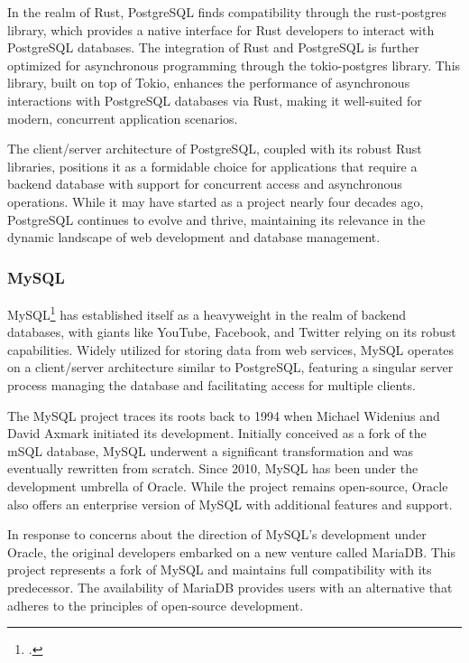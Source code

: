 In the realm of Rust, PostgreSQL finds compatibility through the rust-postgres library, which provides a native interface for Rust developers to interact with 
PostgreSQL databases. The integration of Rust and PostgreSQL is further optimized for asynchronous programming through the tokio-postgres library. This library, 
built on top of Tokio, enhances the performance of asynchronous interactions with PostgreSQL databases via Rust, making it well-suited for modern, concurrent 
application scenarios.\newline

The client/server architecture of PostgreSQL, coupled with its robust Rust libraries, positions it as a formidable choice for applications that require a 
backend database with support for concurrent access and asynchronous operations. While it may have started as a project nearly four decades ago, PostgreSQL 
continues to evolve and thrive, maintaining its relevance in the dynamic landscape of web development and database management.

\subsubsection{MySQL}
MySQL\footcite{mysql} has established itself as a heavyweight in the realm of backend databases, with giants like YouTube, Facebook, and Twitter relying on its 
robust capabilities. Widely utilized for storing data from web services, MySQL operates on a client/server architecture similar to PostgreSQL, featuring a 
singular server process managing the database and facilitating access for multiple clients.\newline

The MySQL project traces its roots back to 1994 when Michael Widenius and David Axmark initiated its development. Initially conceived as a fork of the mSQL 
database, MySQL underwent a significant transformation and was eventually rewritten from scratch. Since 2010, MySQL has been under the development umbrella of 
Oracle. While the project remains open-source, Oracle also offers an enterprise version of MySQL with additional features and support.\newline

In response to concerns about the direction of MySQL's development under Oracle, the original developers embarked on a new venture called MariaDB. This project 
represents a fork of MySQL and maintains full compatibility with its predecessor. The availability of MariaDB provides users with an alternative that adheres 
to the principles of open-source development.\newline

